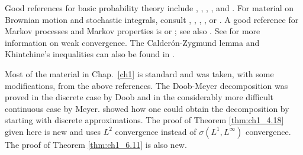 \notessection
{}

Good references for basic probability theory include \cite{Billingsley1986}, \cite{Breiman1968}, \cite{Chung1974}, \cite{Dudley1989}, and \cite{Durrett1991}. For material on Brownian motion and stochastic integrals, consult \cite{KaratzasShreve1988}, \cite{RevuzYor1991}, \cite{IkedaWatanabe1981}, \cite{Protter1990}, or \cite{DellacherieMeyer1980}. A good reference for Markov processes and Markov properties is \cite{BlumenthalGetoor1968} or \cite{Sharpe1988}; see also \cite{Durrett1984}. See \cite{Billingsley1968} for more information on weak convergence. The Calder\'on-Zygmund lemma and Khintchine's inequalities can also be found in \cite{Stein1970a}.


Most of the material in Chap.\ \ref{ch1} is standard and was taken, with some modifications, from the above references. The Doob-Meyer decomposition was proved in the discrete case by Doob and in the considerably more difficult continuous case by Meyer. \cite{Rao1969} showed how one could obtain the decomposition by starting with discrete approximations. The proof of Theorem \ref{thm:ch1_4.18} given here is new and uses $L^2$ convergence instead of $\sigma(L^1, L^\infty)$ convergence. The proof of Theorem \ref{thm:ch1_6.11} is also new.